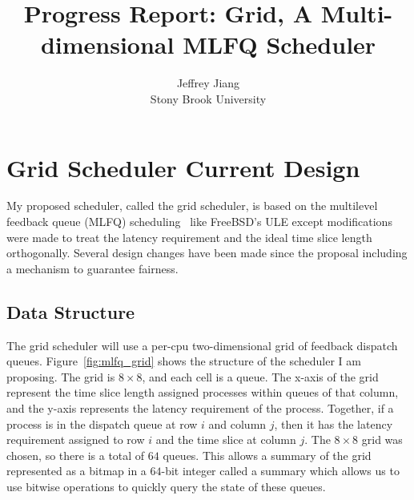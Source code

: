 \documentclass[letterpaper,twocolumn,10pt]{article}
\begin{document}

\date{}

\title{\Large \bf Progress Report: Grid, A Multi-dimensional MLFQ Scheduler}

\author{
{\rm Jeffrey Jiang}\\
Stony Brook University
} %

\maketitle

\section{Grid Scheduler Current Design}

My proposed scheduler, called the grid scheduler, is based on the multilevel feedback 
queue (MLFQ) scheduling~\cite{mlfq} like FreeBSD's ULE except modifications were made 
to treat the latency requirement and the ideal time slice length orthogonally.
Several design changes have been made since the proposal including a mechanism 
to guarantee fairness. 

\subsection{Data Structure}

The grid scheduler will use a per-cpu two-dimensional grid of feedback dispatch queues. 
Figure~\ref{fig:mlfq_grid} shows the structure of the scheduler I am proposing. 
The grid is \(8\times 8\), and each cell is a queue. The x-axis of the grid represent 
the time slice length assigned processes within queues of that column, and the y-axis 
represents the latency requirement of the process. Together, if a process is in the 
dispatch queue at row \(i\) and column \(j\), then it has the latency requirement assigned to 
row \(i\) and the time slice at column \(j\). The \(8\times 8\) grid was chosen, so 
there is a total of \(64\) queues. This allows a summary of the grid represented as a 
bitmap in a \(64\)-bit integer called a summary which allows us to use bitwise 
operations to quickly query the state of these queues.
\end{document}
